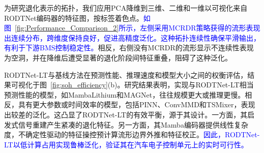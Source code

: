 \documentclass[UTF8,lettersize,journal]{IEEEtran}
\newcommand{\rev}[1]{\textcolor{blue}{#1}}
\begin{document}
为研究退化表示的拓扑，我们应用PCA降维到三维、二维和一维以可视化来自RODTNet编码器的特征图，按标签着色点。\rev{如图~\ref{fig:Performance_Comparison_2}所示，左侧采用MCRDR策略获得的流形表现出连续分布，跨维度保持良好，促进高精度泛化。这种拓扑连续性确保平滑输出，有利于下游BMS控制稳定性。}相反，右侧没有MCRDR的流形显示不连续性表现为空洞，并在降维后遭受显著的退化阶段间特征重叠，阻碍了这种泛化。

RODTNet-LT与基线方法在预测性能、推理速度和模型大小之间的权衡评估，结果可视化于图~\ref{fig:soh_efficiency}(b)。研究结果表明，实现与RODTNet-LT相当预测性能的模型，如MambaLithium和MAGNet，往往规模更大或推理更慢。相反，具有更大参数或时间效率的模型，包括PINN、ConvMMD和TSMixer，表现出较差的泛化。这凸显了RODTNet-LT的有效平衡，源于其设计。一方面，其启发式信号重建产生紧凑的退化特征。另一方面，其Mamba编码器提供线性复杂度，不确定性驱动的特征操控预计算流形边界外推和特征校正。\rev{因此，RODTNet-LT以低计算占用实现鲁棒泛化，验证其在汽车电子控制单元上的实时可行性。}
\end{document}
